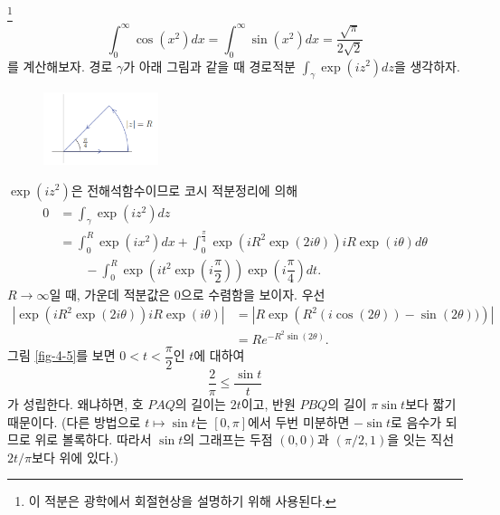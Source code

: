 \begin{salt_example} [프레넬 적분]\footnote{
이 적분은 광학에서 회절현상을 설명하기 위해 사용된다.
}
\label{example-4-20}
\[
\int_0^\infty \cos(x^2) dx =  \int_0^\infty \sin(x^2) dx 
= \dfrac{\sqrt{\pi}}{2\sqrt{2}}
\]
를 계산해보자.
경로 $\gamma$가 아래 그림과 같을 때
경로적분 $\int_\gamma \exp(iz^2) dz$을 생각하자.

\begin{figure}[h!]
\begin{center}
\includegraphics[width=0.3\textwidth]{./SaltChapter/fig-4-0-13}
\end{center}
\end{figure}

$\exp(iz^2)$은 전해석함수이므로
코시 적분정리에 의해
\begin{align*}
0 &= \int_\gamma \exp(iz^2) dz \\
& = \int_0^R \exp(ix^2)dx 
+ \int_0^{\frac\pi4} \exp(iR^2\exp(2i\theta))iR\exp(i\theta)d\theta \\
&\quad\quad 
- \int_0^R \exp\left( it^2\exp\left(i\dfrac\pi2\right)\right) 
\exp\left( i\dfrac\pi4\right)dt.
\end{align*}
$R\to\infty$일 때, 가운데 적분값은 $0$으로 수렴함을 보이자.
우선 
\begin{align*}
\left|  \exp(iR^2\exp(2i\theta))iR\exp(i\theta)  \right|
&= \left| R\exp\left(R^2(i\cos(2\theta)) - \sin(2\theta))\right) \right| \\
&= Re^{-R^2\sin(2\theta)}.
\end{align*}
그림 \ref{fig-4-5}를 보면 $0<t<\dfrac\pi2$인 $t$에 대하여
\[
\dfrac2\pi \le \dfrac{\sin t}t
\]
가 성립한다. 왜냐하면, 호 $PAQ$의 길이는 $2t$이고,
반원 $PBQ$의 길이 $\pi\sin t$보다 짧기 때문이다.
(다른 방법으로 $t\mapsto \sin t$는 $[0,\pi]$에서 
두번 미분하면 $-\sin t$로 음수가 되므로 위로 볼록하다.
따라서 $\sin t$의 그래프는 두점 $(0,0)$과 $(\pi/2,1)$을 잇는 직선 $2t/\pi$보다 위에 있다.)



\end{salt_example}
